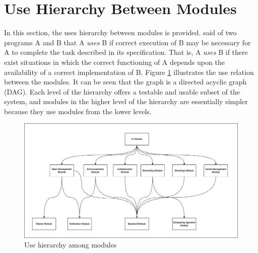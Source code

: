 \documentclass[12pt, titlepage]{article}
\begin{document}
\section{Use Hierarchy Between Modules} \label{SecUse}

In this section, the uses hierarchy between modules is
provided. \citet{Parnas1978} said of two programs A and B that A {\em uses} B if
correct execution of B may be necessary for A to complete the task described in
its specification. That is, A {\em uses} B if there exist situations in which
the correct functioning of A depends upon the availability of a correct
implementation of B.  Figure \ref{FigUH} illustrates the use relation between
the modules. It can be seen that the graph is a directed acyclic graph
(DAG). Each level of the hierarchy offers a testable and usable subset of the
system, and modules in the higher level of the hierarchy are essentially simpler
because they use modules from the lower levels.



\begin{figure}[H]
\centering
\includegraphics[width=1.1\textwidth]{module-decomp.png}
\caption{Use hierarchy among modules}
\label{FigUH}
\end{figure}

\end{document}

